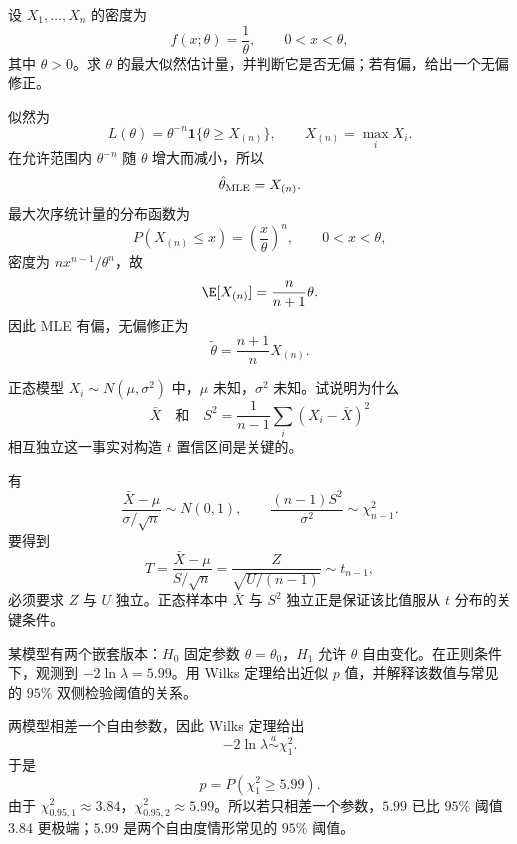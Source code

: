 \begin{question}
设 $X_1,\ldots,X_n$ 的密度为
\[
f(x;\theta)=\frac1\theta,\qquad 0<x<\theta,
\]
其中 $\theta>0$。求 $\theta$ 的最大似然估计量，并判断它是否无偏；若有偏，给出一个无偏修正。
\begin{solution}
似然为
\[
L(\theta)=\theta^{-n}\mathbf1\{\theta\ge X_{(n)}\},
\qquad X_{(n)}=\max_iX_i.
\]
在允许范围内 $\theta^{-n}$ 随 $\theta$ 增大而减小，所以
\[
\hat\theta_{\rm MLE}=X_{(n)}.
\]
最大次序统计量的分布函数为
\[
P(X_{(n)}\le x)=\left(\frac x\theta\right)^n,
\qquad 0<x<\theta,
\]
密度为 $nx^{n-1}/\theta^n$，故
\[
\E[X_{(n)}]=\frac n{n+1}\theta.
\]
因此 MLE 有偏，无偏修正为
\[
\tilde\theta=\frac{n+1}{n}X_{(n)}.
\]
\end{solution}
\end{question}

\begin{question}
正态模型 $X_i\sim N(\mu,\sigma^2)$ 中，$\mu$ 未知，$\sigma^2$ 未知。试说明为什么
\[
\bar X\quad\text{和}\quad S^2=\frac1{n-1}\sum_i(X_i-\bar X)^2
\]
相互独立这一事实对构造 $t$ 置信区间是关键的。
\begin{solution}
有
\[
\frac{\bar X-\mu}{\sigma/\sqrt n}\sim N(0,1),
\qquad
\frac{(n-1)S^2}{\sigma^2}\sim\chi^2_{n-1}.
\]
要得到
\[
T=\frac{\bar X-\mu}{S/\sqrt n}
=\frac{Z}{\sqrt{U/(n-1)}}\sim t_{n-1},
\]
必须要求 $Z$ 与 $U$ 独立。正态样本中 $\bar X$ 与 $S^2$ 独立正是保证该比值服从 $t$ 分布的关键条件。
\end{solution}
\end{question}

\begin{question}
某模型有两个嵌套版本：$H_0$ 固定参数 $\theta=\theta_0$，$H_1$ 允许 $\theta$ 自由变化。在正则条件下，观测到 $-2\ln\lambda=5.99$。用 Wilks 定理给出近似 $p$ 值，并解释该数值与常见的 $95\%$ 双侧检验阈值的关系。
\begin{solution}
两模型相差一个自由参数，因此 Wilks 定理给出
\[
-2\ln\lambda\overset{a}{\sim}\chi^2_1.
\]
于是
\[
p=P(\chi^2_1\ge5.99).
\]
由于 $\chi^2_{0.95,1}\approx3.84$，$\chi^2_{0.95,2}\approx5.99$。所以若只相差一个参数，$5.99$ 已比 $95\%$ 阈值 $3.84$ 更极端；$5.99$ 是两个自由度情形常见的 $95\%$ 阈值。
\end{solution}
\end{question}

